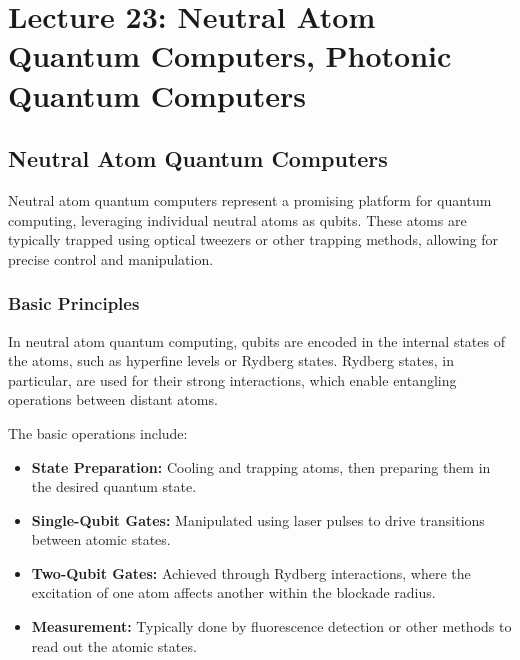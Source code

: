 \section{Lecture 23: Neutral Atom Quantum Computers, Photonic Quantum Computers}
\label{sec:lecture23}

\subsection*{Neutral Atom Quantum Computers}

Neutral atom quantum computers represent a promising platform for quantum
computing, leveraging individual neutral atoms as qubits. These atoms are
typically trapped using optical tweezers or other trapping methods, allowing
for precise control and manipulation.

\subsubsection*{Basic Principles}

In neutral atom quantum computing, qubits are encoded in the internal states
of the atoms, such as hyperfine levels or Rydberg states. Rydberg states, in
particular, are used for their strong interactions, which enable entangling
operations between distant atoms.

\vspace{0.3cm}

\noindent
The basic operations include:

\begin{itemize}
  \item \textbf{State Preparation:} Cooling and trapping atoms, then
    preparing them in the desired quantum state.
  \item \textbf{Single-Qubit Gates:} Manipulated using laser pulses to drive
    transitions between atomic states.
  \item \textbf{Two-Qubit Gates:} Achieved through Rydberg interactions,
    where the excitation of one atom affects another within the blockade
    radius.
  \item \textbf{Measurement:} Typically done by fluorescence detection or
    other methods to read out the atomic states.
\end{itemize}

\vspace{0.3cm}



